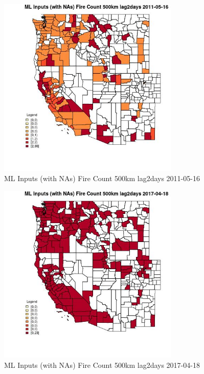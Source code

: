 \begin{figure} 
\centering  
\includegraphics[width=0.77\textwidth]{Code_Outputs/Report_ML_input_PM25_Step4_part_e_de_duplicated_aves_compiled_2019-05-21wNAs_CountyFire_Count_500km_lag2daysMean2011-05-16.jpg} 
\caption{\label{fig:Report_ML_input_PM25_Step4_part_e_de_duplicated_aves_compiled_2019-05-21wNAsCountyFire_Count_500km_lag2daysMean2011-05-16}ML Inputs (with NAs) Fire Count 500km lag2days 2011-05-16} 
\end{figure} 
 

\begin{figure} 
\centering  
\includegraphics[width=0.77\textwidth]{Code_Outputs/Report_ML_input_PM25_Step4_part_e_de_duplicated_aves_compiled_2019-05-21wNAs_CountyFire_Count_500km_lag2daysMean2017-04-18.jpg} 
\caption{\label{fig:Report_ML_input_PM25_Step4_part_e_de_duplicated_aves_compiled_2019-05-21wNAsCountyFire_Count_500km_lag2daysMean2017-04-18}ML Inputs (with NAs) Fire Count 500km lag2days 2017-04-18} 
\end{figure} 
 


